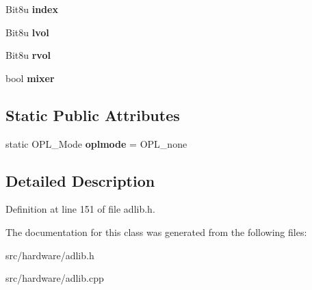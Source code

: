 \begin{DoxyCompactItemize}
\item 
\hypertarget{classAdlib_1_1Module_a3cf5b48a356e922f13ff3fff91867cc5}{Bit8u {\bfseries index}}\label{classAdlib_1_1Module_a3cf5b48a356e922f13ff3fff91867cc5}

\item 
\hypertarget{classAdlib_1_1Module_ac5f795bd406e34f70cd30986e173aa58}{Bit8u {\bfseries lvol}}\label{classAdlib_1_1Module_ac5f795bd406e34f70cd30986e173aa58}

\item 
\hypertarget{classAdlib_1_1Module_ab69d004a0e0df215c99cd9aae6b25448}{Bit8u {\bfseries rvol}}\label{classAdlib_1_1Module_ab69d004a0e0df215c99cd9aae6b25448}

\item 
\hypertarget{classAdlib_1_1Module_ad6fb6e1c8fc28811c3848c754ec5d250}{bool {\bfseries mixer}}\label{classAdlib_1_1Module_ad6fb6e1c8fc28811c3848c754ec5d250}

\end{DoxyCompactItemize}
\subsection*{Static Public Attributes}
\begin{DoxyCompactItemize}
\item 
\hypertarget{classAdlib_1_1Module_a4b15a75a7fed20aa923ee1ad44a0e6c2}{static O\-P\-L\-\_\-\-Mode {\bfseries oplmode} = O\-P\-L\-\_\-none}\label{classAdlib_1_1Module_a4b15a75a7fed20aa923ee1ad44a0e6c2}

\end{DoxyCompactItemize}


\subsection{Detailed Description}


Definition at line 151 of file adlib.\-h.



The documentation for this class was generated from the following files\-:\begin{DoxyCompactItemize}
\item 
src/hardware/adlib.\-h\item 
src/hardware/adlib.\-cpp\end{DoxyCompactItemize}
